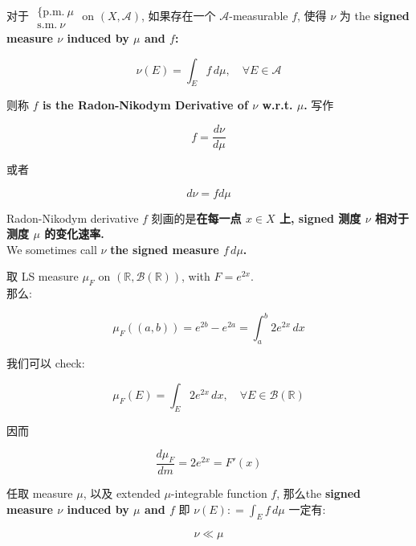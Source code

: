 \begin{definition}{}

对于 \(\begin{matrix}
{\{\text{p.m.}\ \mu} \\
{\text{s.m.}\ \nu}
\end{matrix}\) on \((X,\mathcal{A})\), 如果存在一个 \(\mathcal{A}\)-measurable \(f\), 使得 \(\nu\) 为 the \textbf{signed measure \(\nu\) induced by \(\mu\) and \(f\):}

\[\nu(E) = \int_{E}f\, d\mu,\quad\forall E \in \mathcal{A}\]

则称 \textbf{\(f\) is the Radon-Nikodym Derivative of \(\nu\) w.r.t. \(\mu\).} 写作

\[f = \frac{d\nu}{d\mu}\]

或者

\[d\nu = fd\mu\]

\end{definition}

Radon-Nikodym derivative \(f\) 刻画的是\textbf{在每一点 \(x \in X\) 上, signed 测度 \(\nu\) 相对于测度 \(\mu\) 的变化速率.}\\
We sometimes call \(\nu\) \textbf{the signed measure \(f\, d\mu\).}\\

\begin{example}

取 LS measure \(\mu_{F}\) on \((\mathbb{R},\mathcal{B}(\mathbb{R}))\), with \(F = e^{2x}\).\\
那么:

\[\mu_{F}((a,b)) = e^{2b} - e^{2a} = \int_{a}^{b}2e^{2x}\, dx\]

我们可以 check:

\[\mu_{F}(E) = \int_{E}2e^{2x}\, dx,\quad\forall E \in \mathcal{B}(\mathbb{R})\]

因而

\[\frac{d\mu_{F}}{dm} = 2e^{2x} = F'(x)\]

\end{example}

\begin{proposition}

任取 measure \(\mu\), 以及 extended \(\mu\)-integrable function \(f\), 那么the \textbf{signed measure \(\nu\) induced by \(\mu\) and \(f\)} 即 \(\nu(E): = \int_{E}f\, d\mu\) 一定有:

\[\nu \ll \mu\]

\end{proposition}

